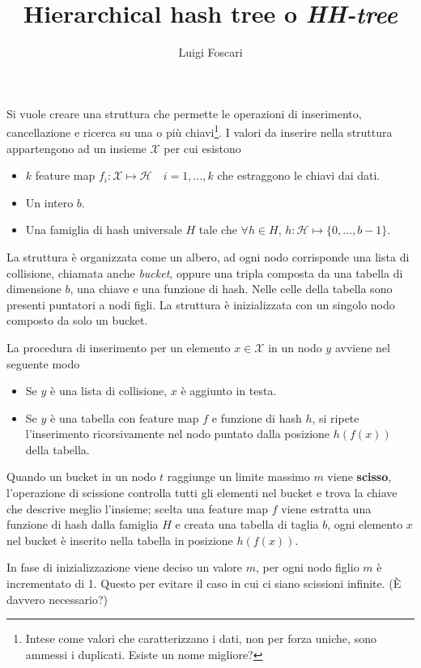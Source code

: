\documentclass[a4paper]{article}
\title{Hierarchical hash tree o \textit{HH-tree}}
\author{Luigi Foscari}
\date{}
\begin{document}
\maketitle

Si vuole creare una struttura che permette le operazioni di inserimento, cancellazione e ricerca su una o più chiavi\footnote{Intese come valori che caratterizzano i dati, non per forza uniche, sono ammessi i duplicati. Esiste un nome migliore?}. I valori da inserire nella struttura appartengono ad un insieme $\mathcal{X}$ per cui esistono
\begin{itemize}
	\item $k$ feature map $f_i: \mathcal{X} \mapsto \mathcal{H} \quad i=1,\ldots,k$ che estraggono le chiavi dai dati.
	\item Un intero $b$.
	\item Una famiglia di hash universale $H$ tale che $\forall h \in H$, $h: \mathcal{H} \mapsto \{ 0, \ldots, b - 1 \}$.
\end{itemize}

La struttura è organizzata come un albero, ad ogni nodo corrisponde una lista di collisione, chiamata anche \textit{bucket}, oppure una tripla composta da una tabella di dimensione $b$, una chiave e una funzione di hash. Nelle celle della tabella sono presenti puntatori a nodi figli. La struttura è inizializzata con un singolo nodo composto da solo un bucket.

La procedura di inserimento per un elemento $x \in \mathcal{X}$ in un nodo $y$ avviene nel seguente modo
\begin{itemize}
	\item Se $y$ è una lista di collisione, $x$ è aggiunto in testa.
	\item Se $y$ è una tabella con feature map $f$ e funzione di hash $h$, si ripete l'inserimento ricorsivamente nel nodo puntato dalla posizione $h(f(x))$ della tabella.
\end{itemize}

Quando un bucket in un nodo $t$ raggiunge un limite massimo $m$ viene \textbf{scisso}, l'operazione di scissione controlla tutti gli elementi nel bucket e trova la chiave che descrive meglio l'insieme; scelta una feature map $f$ viene estratta una funzione di hash dalla famiglia $H$ e creata una tabella di taglia $b$, ogni elemento $x$ nel bucket è inserito nella tabella in posizione $h(f(x))$.

In fase di inizializzazione viene deciso un valore $m$, per ogni nodo figlio $m$ è incrementato di 1. Questo per evitare il caso in cui ci siano scissioni infinite. (È davvero necessario?)
\end{document}
